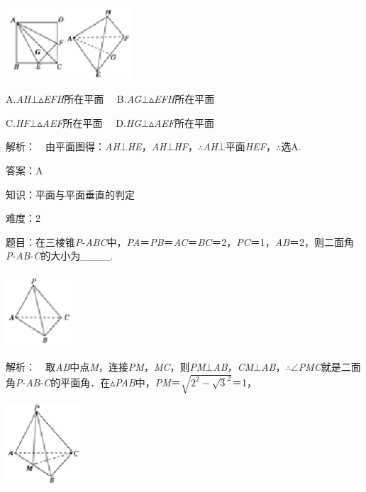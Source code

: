 \documentclass{article} %
\begin{document}
\includegraphics*[width=1.87in, height=1.08in, keepaspectratio=false]{image222}

A.\textit{AH}$\mathrm{\bot}$$\mathrm{\vartriangle}$\textit{EFH}所在平面　 B.\textit{AG}$\mathrm{\bot}$$\mathrm{\vartriangle}$\textit{EFH}所在平面

C.\textit{HF}$\mathrm{\bot}$$\mathrm{\vartriangle}$\textit{AEF}所在平面　 D.\textit{HG}$\mathrm{\bot}$$\mathrm{\vartriangle}$\textit{AEF}所在平面

解析：　由平面图得：\textit{AH}$\mathrm{\bot}$\textit{HE}，\textit{AH}$\mathrm{\bot}$\textit{HF}，$\mathrm{\therefore}$\textit{AH}$\mathrm{\bot}$平面\textit{HEF}，$\mathrm{\therefore}$选A.

答案：A

知识：平面与平面垂直的判定

难度：2

题目：在三棱锥\textit{P}-\textit{ABC}中，\textit{PA}＝\textit{PB}＝\textit{AC}＝\textit{BC}＝2，\textit{PC}＝1，\textit{AB}＝2，则二面角\textit{P}-\textit{AB}-\textit{C}的大小为\_\_\_\_.

\includegraphics*[width=1.00in, height=1.09in, keepaspectratio=false]{image223}

解析：　取\textit{AB}中点\textit{M}，连接\textit{PM}，\textit{MC}，则\textit{PM}$\mathrm{\bot}$\textit{AB}，\textit{CM}$\mathrm{\bot}$\textit{AB}，$\mathrm{\therefore}$$\mathrm{\angle}$\textit{PMC}就是二面角\textit{P}-\textit{AB}-\textit{C}的平面角．在$\mathrm{\vartriangle}$\textit{PAB}中，\textit{PM}＝$\sqrt{2^2-\sqrt{3}^2}$＝1，

\includegraphics*[width=1.11in, height=1.21in, keepaspectratio=false]{image224}
\end{document}
